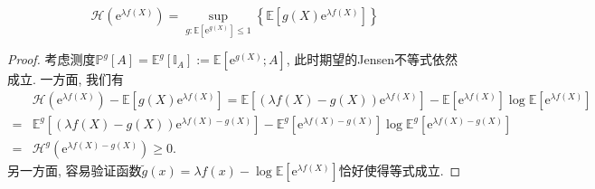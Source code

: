 \begin{theorem}[熵的变分表示]\label{thm:VariationalRepresentationForEntropy}
	\begin{equation}\label{eq:VariationalRepresentationForEntropy}
		\mathcal{H}(\mathrm{e}^{\lambda f(X)})
		= \sup_{g \colon \mathbb{E}[\mathrm{e}^{g(X)}] \leq 1} \left\{ \mathbb{E} \left[g(X) \mathrm{e}^{\lambda f(X)} \right] \right\}
	\end{equation}
\end{theorem}
\begin{proof}
	考虑测度$\mathbb{P}^g[A] = \mathbb{E}^g [\mathbb{I}_A] := \mathbb{E}[\mathrm{e}^{g(X)}; A]$, 此时期望的Jensen不等式依然成立. 
	一方面, 我们有
	\begin{align*}
		&\mathcal{H}(\mathrm{e}^{\lambda f(X)}) - \mathbb{E}[g(X) \mathrm{e}^{\lambda f(X)}]
		= \mathbb{E}\left[ (\lambda f(X) - g(X)) \mathrm{e}^{\lambda f(X)} \right] - \mathbb{E}[ \mathrm{e}^{\lambda f(X)}] \log \mathbb{E}[ \mathrm{e}^{\lambda f(X)}] \\
		=& \mathbb{E}^g  \left[ (\lambda f(X) - g(X)) \mathrm{e}^{\lambda f(X) - g(X)} \right] - \mathbb{E}^g[ \mathrm{e}^{\lambda f(X) - g(X)}] \log \mathbb{E}^g[ \mathrm{e}^{\lambda f(X) - g(X)}] \\
		=& \mathcal{H}^g(\mathrm{e}^{\lambda f(X) - g(X)}) \geq 0. 
	\end{align*}
	另一方面, 容易验证函数$\tilde g(x) = \lambda f(x) - \log \mathbb{E}[\mathrm{e}^{\lambda f(X)}]$恰好使得等式成立. 
\end{proof}

